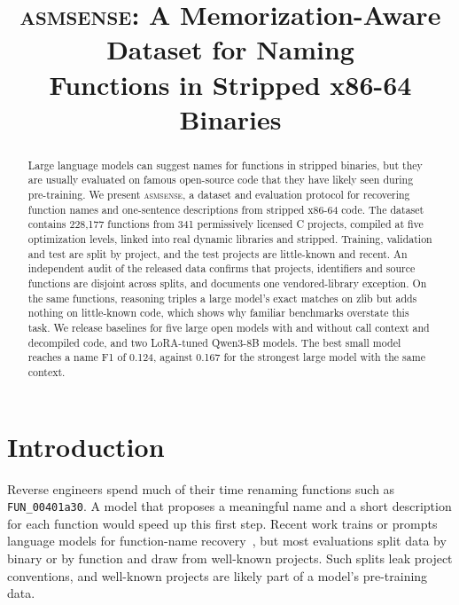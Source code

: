 \documentclass[conference]{IEEEtran}
\newcommand{\tool}{\textsc{asmsense}\xspace}
\begin{document}
\title{\tool: A Memorization-Aware Dataset for Naming\\Functions in Stripped x86-64 Binaries}

\author{
}

\maketitle

\begin{abstract}
Large language models can suggest names for functions in stripped binaries, but they are usually evaluated on famous open-source code that they have likely seen during pre-training. We present \tool, a dataset and evaluation protocol for recovering function names and one-sentence descriptions from stripped x86-64 code. The dataset contains 228,177 functions from 341 permissively licensed C projects, compiled at five optimization levels, linked into real dynamic libraries and stripped. Training, validation and test are split by project, and the test projects are little-known and recent. An independent audit of the released data confirms that projects, identifiers and source functions are disjoint across splits, and documents one vendored-library exception. On the same functions, reasoning triples a large model's exact matches on zlib but adds nothing on little-known code, which shows why familiar benchmarks overstate this task. We release baselines for five large open models with and without call context and decompiled code, and two LoRA-tuned Qwen3-8B models. The best small model reaches a name F1 of 0.124, against 0.167 for the strongest large model with the same context.
\end{abstract}

\section{Introduction}
Reverse engineers spend much of their time renaming functions such as \texttt{FUN\_00401a30}. A model that proposes a meaningful name and a short description for each function would speed up this first step. Recent work trains or prompts language models for function-name recovery~\cite{symlm,xfl,nero,llm4decompile}, but most evaluations split data by binary or by function and draw from well-known projects. Such splits leak project conventions, and well-known projects are likely part of a model's pre-training data.
\end{document}
